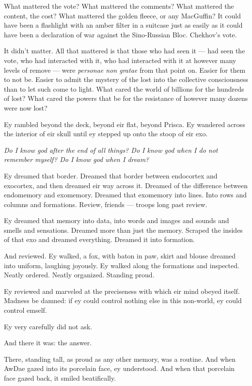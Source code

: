 What mattered the vote? What mattered the comments? What mattered the content, the cost? What mattered the golden fleece, or any MacGuffin? It could have been a flashlight with an amber filter in a suitcase just as easily as it could have been a declaration of war against the Sino-Russian Bloc. Chekhov's vote.

It didn't matter. All that mattered is that those who had seen it — had seen the vote, who had interacted with it, who had interacted with it at however many levels of remove — were \emph{personae non gratae} from that point on. Easier for them to not be. Easier to admit the mystery of the lost into the collective consciousness than to let such come to light. What cared the world of billions for the hundreds of lost? What cared the powers that be for the resistance of however many dozens were now lost?

Ey rambled beyond the deck, beyond eir flat, beyond Prisca. Ey wandered across the interior of eir skull until ey stepped up onto the stoop of eir exo.

\emph{Do I know god after the end of all things? Do I know god when I do not remember myself? Do I know god when I dream?}

Ey dreamed that border. Dreamed that border between endocortex and exocortex, and then dreamed eir way across it. Dreamed of the difference between endomemory and exomemory. Dreamed that exomemory into lines. Into rows and columns and formations. Review, friends — troops long past review.

Ey dreamed that memory into data, into words and images and sounds and smells and sensations. Dreamed more than just the memory. Scraped the insides of that exo and dreamed everything. Dreamed it into formation.

And reviewed. Ey walked, a fox, with baton in paw, skirt and blouse dreamed into uniform, laughing joyously. Ey walked along the formations and inspected. Neatly ordered. Neatly organized. Standing proud.

Ey reviewed and marveled at the preciseness with which eir mind obeyed itself. Madness be damned: if ey could control nothing else in this non-world, ey could control emself.

Ey very carefully did not ask.

And there it was: the answer.

There, standing tall, as proud as any other memory, was a routine. And when AwDae gazed into its porcelain face, ey understood. And when that porcelain face gazed back, it smiled beatifically.

